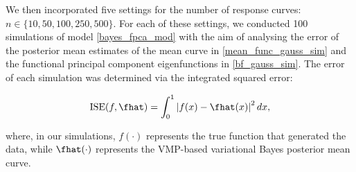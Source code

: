 \documentclass[12pt]{article}
\theoremstyle{plain}
\theoremstyle{definition}
\theoremstyle{remark}
\begin{document}
We then incorporated five settings for the number of response curves: $n \in \{ 10, 50, 100, 250, 500 \}$. For each of these
settings, we conducted 100 simulations of model \eqref{bayes_fpca_mod} with the aim of analysing the error of
the posterior mean estimates of the mean curve in \eqref{mean_func_gauss_sim} and the functional principal
component eigenfunctions in \eqref{bf_gauss_sim}. The error of each simulation was determined via the
integrated squared error:

\begin{equation}
	\text{ISE} (f, \fhat) = \int_0^1 \left| f (x) - \fhat(x) \right|^2 dx,
\label{ise}
\end{equation}

\noindent where, in our simulations, $f (\cdot)$ represents the true function that generated the data, while $\fhat (\cdot)$
represents the VMP-based variational Bayes posterior mean curve.
\end{document}

